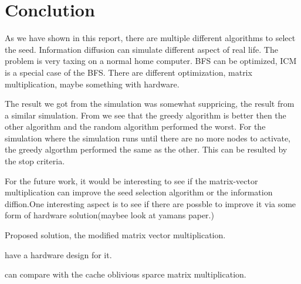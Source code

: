 \chapter{Conclution}
As we have shown in this report, there are multiple different algorithms to select the seed. Information diffusion can simulate different aspect of real life. The problem is very taxing on a normal home computer. BFS can be optimized, ICM is a special case of the BFS. There are different optimization, matrix multiplication, maybe something with hardware. 

The result we got from the simulation was somewhat suppricing, the result from a similar simulation\cite{MaximizedSpread2003}. From \cite{MaximizedSpread2003} we see that the greedy algorithm is better then the other algorithm and the random algorithm performed the worst. For the simulation where the simulation runs until there are no more nodes to activate, the greedy algorthm performed the same as the other. This can be resulted by the stop criteria.

For the future work, it would be interesting to see if the matrix-vector multiplication can improve the seed selection algorithm or the information diffion.One interesting aspect is to see if there are possble to improve it via some form of hardware solution(maybee look at yamans paper.)

Proposed solution, the modified matrix vector multiplication.

have a hardware design for it.

can compare with the cache oblivious sparce matrix multiplication.